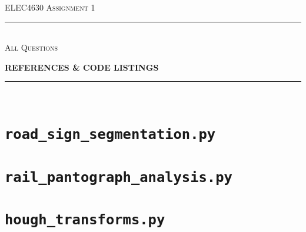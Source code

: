 \begin{titlepage}
  \centering

  \textsc{ELEC4630 Assignment 1}\\
  \vspace{9cm}

  \rule{\linewidth}{0.5pt}\\

  \vspace{1em}
  \LARGE\textsc{All Questions}\\
  \vspace{1em}

  \LARGE\uppercase{\textbf{{References \& Code Listings}}}\\

  \rule{\linewidth}{2pt}\\

  \vfill

\end{titlepage}


\appendix

\newpage
\section{\texttt{road\_sign\_segmentation.py}}


\newpage
\section{\texttt{rail\_pantograph\_analysis.py}}


\newpage
\section{\texttt{hough\_transforms.py}}
